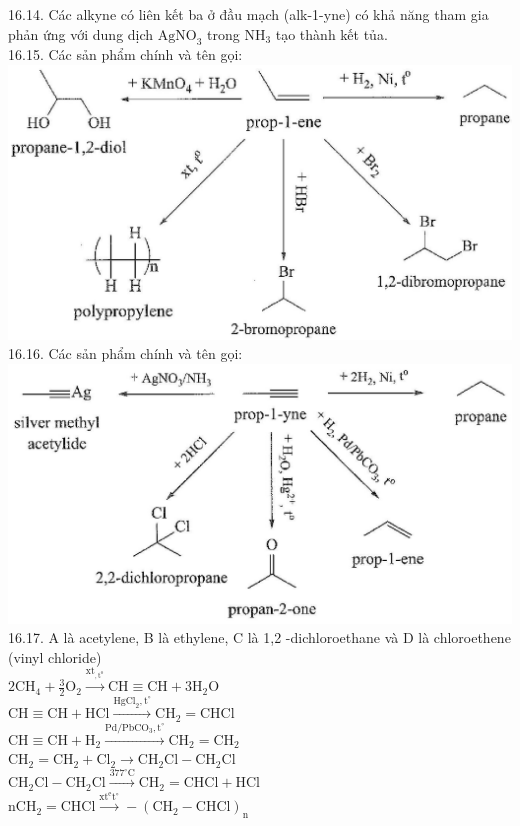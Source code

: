 \documentclass[10pt]{article}
\begin{document}
16.14. Các alkyne có liên kết ba ở đầu mạch (alk-1-yne) có khả năng tham gia phản ứng với dung dịch $\mathrm{AgNO}_{3}$ trong $\mathrm{NH}_{3}$ tạo thành kết tủa.\\
16.15. Các sản phẩm chính và tên gọi:\\
\includegraphics[max width=\textwidth, center]{2025_10_23_ed7118e3280f74e91193g-26(1)}\\
16.16. Các sản phẩm chính và tên gọi:\\
\includegraphics[max width=\textwidth, center]{2025_10_23_ed7118e3280f74e91193g-26}\\
16.17. A là acetylene, B là ethylene, C là 1,2 -dichloroethane và D là chloroethene (vinyl chloride)\\
$2 \mathrm{CH}_{4}+\frac{3}{2} \mathrm{O}_{2} \xrightarrow{\mathrm{xt}_{, \mathrm{t}^{\mathrm{o}}}} \mathrm{CH} \equiv \mathrm{CH}+3 \mathrm{H}_{2} \mathrm{O}$\\
$\mathrm{CH} \equiv \mathrm{CH}+\mathrm{HCl} \xrightarrow{\mathrm{HgCl}_{2}, \mathrm{t}^{\circ}} \mathrm{CH}_{2}=\mathrm{CHCl}$\\
$\mathrm{CH} \equiv \mathrm{CH}+\mathrm{H}_{2} \xrightarrow{\mathrm{Pd} / \mathrm{PbCO}_{3}, \mathrm{t}^{\circ}} \mathrm{CH}_{2}=\mathrm{CH}_{2}$\\
$\mathrm{CH}_{2}=\mathrm{CH}_{2}+\mathrm{Cl}_{2} \longrightarrow \mathrm{CH}_{2} \mathrm{Cl}-\mathrm{CH}_{2} \mathrm{Cl}$\\
$\mathrm{CH}_{2} \mathrm{Cl}-\mathrm{CH}_{2} \mathrm{Cl} \xrightarrow{377^{\circ} \mathrm{C}} \mathrm{CH}_{2}=\mathrm{CHCl}+\mathrm{HCl}$\\
$\mathrm{nCH}_{2}=\mathrm{CHCl} \xrightarrow{\mathrm{xt}^{\mathrm{e}} \mathrm{t}^{\circ}}-\left(\mathrm{CH}_{2}-\mathrm{CHCl}\right)_{\mathrm{n}}$
\end{document}
